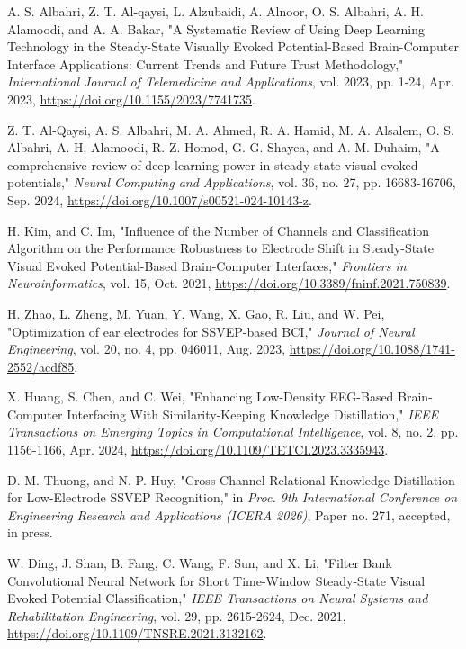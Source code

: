  A. S. Albahri, Z. T. Al-qaysi, L. Alzubaidi, A. Alnoor, O. S. Albahri, A. H. Alamoodi, and A. A. Bakar, "A Systematic Review of Using Deep Learning Technology in the Steady-State Visually Evoked Potential-Based Brain-Computer Interface Applications: Current Trends and Future Trust Methodology," \textit{International Journal of Telemedicine and Applications}, vol. 2023, pp. 1-24, Apr. 2023, \url{https://doi.org/10.1155/2023/7741735}.

 Z. T. Al-Qaysi, A. S. Albahri, M. A. Ahmed, R. A. Hamid, M. A. Alsalem, O. S. Albahri, A. H. Alamoodi, R. Z. Homod, G. G. Shayea, and A. M. Duhaim, "A comprehensive review of deep learning power in steady-state visual evoked potentials," \textit{Neural Computing and Applications}, vol. 36, no. 27, pp. 16683-16706, Sep. 2024, \url{https://doi.org/10.1007/s00521-024-10143-z}.

 H. Kim, and C. Im, "Influence of the Number of Channels and Classification Algorithm on the Performance Robustness to Electrode Shift in Steady-State Visual Evoked Potential-Based Brain-Computer Interfaces," \textit{Frontiers in Neuroinformatics}, vol. 15, Oct. 2021, \url{https://doi.org/10.3389/fninf.2021.750839}.

 H. Zhao, L. Zheng, M. Yuan, Y. Wang, X. Gao, R. Liu, and W. Pei, "Optimization of ear electrodes for SSVEP-based BCI," \textit{Journal of Neural Engineering}, vol. 20, no. 4, pp. 046011, Aug. 2023, \url{https://doi.org/10.1088/1741-2552/acdf85}.

 X. Huang, S. Chen, and C. Wei, "Enhancing Low-Density EEG-Based Brain-Computer Interfacing With Similarity-Keeping Knowledge Distillation," \textit{IEEE Transactions on Emerging Topics in Computational Intelligence}, vol. 8, no. 2, pp. 1156-1166, Apr. 2024, \url{https://doi.org/10.1109/TETCI.2023.3335943}.

 D. M. Thuong, and N. P. Huy, "Cross-Channel Relational Knowledge Distillation for Low-Electrode SSVEP Recognition," in \textit{Proc. 9th International Conference on Engineering Research and Applications (ICERA 2026)}, Paper no. 271, accepted, in press.

 W. Ding, J. Shan, B. Fang, C. Wang, F. Sun, and X. Li, "Filter Bank Convolutional Neural Network for Short Time-Window Steady-State Visual Evoked Potential Classification," \textit{IEEE Transactions on Neural Systems and Rehabilitation Engineering}, vol. 29, pp. 2615-2624, Dec. 2021, \url{https://doi.org/10.1109/TNSRE.2021.3132162}.

